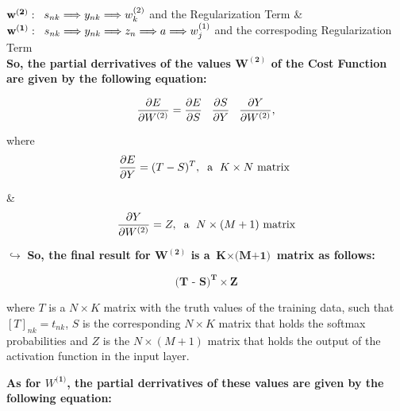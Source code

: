 \documentclass[11pt]{article}
\begin{document}
\noindent $\mathbf{w^{(2)}} : \hspace{2mm} s_{nk}  \Longrightarrow  {y}_{nk} \Longrightarrow {w}_k^{(2)}$ and the Regularization Term \& \\
$\mathbf{w^{(1)}} : \hspace{2mm} s_{nk} \Longrightarrow y_{nk} \Longrightarrow z_{n} \Longrightarrow a \Longrightarrow{w}_j^{(1)}$ and the correspoding Regularization Term \\

\noindent \textbf {So, the partial derrivatives of the values $\mathbf{W^{(2)}}$ of the Cost Function are given by the following equation:}

\begin{equation} \frac{\partial E}{\partial{W^{(2)}}} = \frac{\partial E}{\partial S} \hspace{3mm}  \frac{\partial S}{\partial Y} \hspace{3mm} \frac{\partial Y}{\partial W^{(2)}}, \end{equation}

\noindent where \begin{equation} \frac{\partial E}{\partial Y}  = (T - S)^T, \hspace{2mm} \text{a }\hspace{1mm}K \times N\text{ matrix } \end{equation} 
\begin{center} {\&} 
\begin{equation} \frac{\partial Y}{\partial W^{(2)}} = Z, \hspace{2mm}\text{a }\hspace{1mm} N \times (M+1)\text{ matrix} \end{equation} \end{center}

\noindent $ \hookrightarrow $ \textbf{So, the final result for $\mathbf{W^{(2)}}$ is a
$ \textbf{K} \times \textbf{(M+1)}$ matrix as follows:}

$$ 
\textbf{(T - S)}^\textbf{T} \times \textbf{Z}
$$

\noindent where $T$ is a $N \times K$ matrix with the truth values of the training data, such that $[T]_{nk} = t_{nk}$, $S$ is the corresponding $N \times K$ matrix that holds the softmax probabilities and $Z$ is the $N \times (M + 1)$ matrix that holds the output of the activation function in the input layer.
\newpage

\noindent \textbf{As for $W^{\textbf{(1)}}$, the partial derrivatives of these values are given by the following equation:} \\
\end{document}
